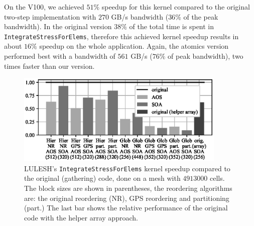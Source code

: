 On the V100, we achieved $51\%$ speedup for this kernel compared to the original
two-step implementation with $270$ GB/s bandwidth ($36\%$ of the peak
bandwidth). In the original version $38\%$ of the total time is spent in
\texttt{IntegrateStressForElems}, therefore this achieved kernel speedup results
in about $16\%$ speedup on the whole application. Again, the atomics version
performed best with a bandwidth of $561$ GB/s ($76\%$ of peak bandwidth), two
times faster than our version.

\begin{figure}[Htbp]
\centering
\includegraphics[width=10cm]{fig/lulesh_speedup.eps}
\caption{LULESH's \texttt{IntegrateStressForElems} kernel speedup compared to
  the original (gathering) code, done on a mesh with $4913000$ cells. The block
  sizes are shown in parentheses, the reordering algorithms are: the original
  reordering (NR), GPS reordering and partitioning (part.) The last bar shows
  the relative performance of the original code with the helper array
  approach.}
\label{fig:lulesh_speedup}
\end{figure}

